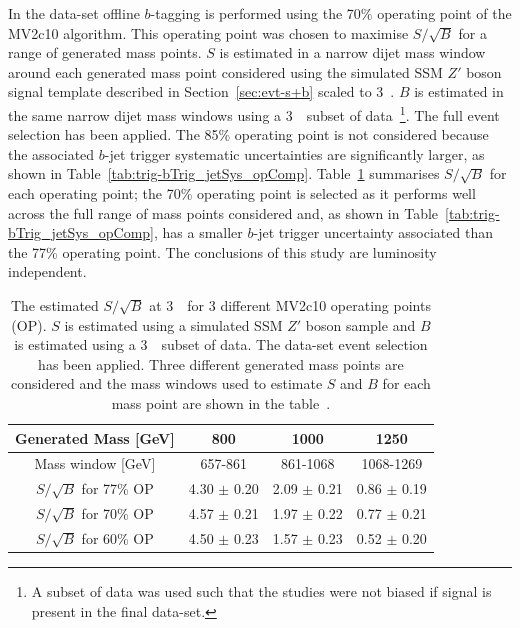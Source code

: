 In the \lm{} data-set offline $b$-tagging is performed using the 70\% operating point of the MV2c10 algorithm.
This operating point was chosen to maximise $S/\sqrt{B}$ for a range of generated mass points.
$S$ is estimated in a narrow dijet mass window around
each generated mass point considered using the simulated SSM $Z'$ boson signal template
described in Section~\ref{sec:evt-s+b} scaled to 3~\ifb.
$B$ is estimated in the same narrow dijet mass windows using a 3~\ifb~subset of \lm{} data~\footnote{A subset of data was used such
  that the studies were not biased if signal is present in the final data-set.}.
The full \lm{} event selection has been applied.
The 85\% operating point is not considered
because the associated $b$-jet trigger systematic uncertainties
are significantly larger, as shown in Table~\ref{tab:trig-bTrig_jetSys_opComp}. %
Table~\ref{tab:evt-btag_lm} summarises $S/\sqrt{B}$ for each operating point;
the 70\% operating point is selected as it performs well across the full range of mass points considered
and, as shown in Table~\ref{tab:trig-bTrig_jetSys_opComp}, has a smaller $b$-jet trigger uncertainty associated than the 77\% operating point.
The conclusions of this study are luminosity independent.

{\renewcommand{\arraystretch}{1.2}
\begin{table}[ht]
\begin{center}
\begin{tabular}{|c||c|c|c|}
  \hline
  Generated Mass [GeV]            &   800       &  1000       & 1250\\
  \hline
  Mass window [GeV]              &   657-861    &  861-1068   &  1068-1269   \\
  \hline
  $S/\sqrt{B}$ for 77\% OP    &  4.30 $\pm$ 0.20 & 2.09 $\pm$ 0.21 & 0.86 $\pm$ 0.19  \\
  $S/\sqrt{B}$ for 70\% OP    &  4.57 $\pm$ 0.21 & 1.97 $\pm$ 0.22 & 0.77 $\pm$ 0.21  \\
  $S/\sqrt{B}$ for 60\% OP    &  4.50 $\pm$ 0.23 & 1.57 $\pm$ 0.23 & 0.52 $\pm$ 0.20  \\
  \hline
\end{tabular}
\caption[The estimated $S/\sqrt{B}$ at 3~\ifb~for 3 different MV2c10 operating points for the \lm{} data-set analysis.]
        {The estimated $S/\sqrt{B}$ at 3~\ifb~for 3 different MV2c10 operating points (OP).
          $S$ is estimated using a simulated SSM $Z'$ boson sample and $B$ is estimated using a 3~\ifb~subset of data.
          The \lm{} data-set event selection has been applied.
          Three different generated mass points are considered and the mass windows used
          to estimate $S$ and $B$ for each mass point are shown in the table~\cite{dibjet-full}.}
\vspace{-1em}
\label{tab:evt-btag_lm}
\end{center}
\end{table}
}

